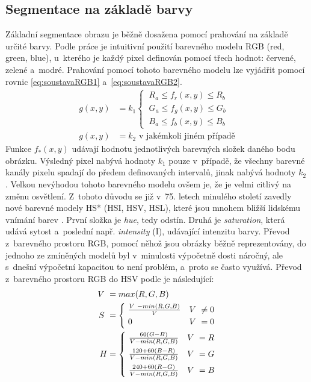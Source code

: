 \subsection*{Segmentace na základě barvy}
\label{zpusobyDetekceSegmentace}
Základní segmentace obrazu je běžně dosažena pomocí prahování na základě určité barvy. Podle práce \cite{tsDetect} je intuitivní použití barevného modelu RGB (red, green, blue), u~kterého je každý pixel definován pomocí třech hodnot: červené, zelené a~modré. Prahování pomocí tohoto barevného modelu lze vyjádřit pomocí rovnic \eqref{eq:soustavaRGB1} a~\eqref{eq:soustavaRGB2}.
\begin{align}
    \label{eq:soustavaRGB1}
    g(x,y) &= k_1\begin{cases}
    \ R_a \leq f_r(x,y) \leq R_b\\
    \ G_a \leq f_g(x,y) \leq G_b\\
    \ B_a \leq f_b(x,y) \leq B_b\end{cases}\\
    \label{eq:soustavaRGB2}
    g(x,y) &= k_2 \text{ v~jakémkoli jiném případě}
\end{align}
Funkce $f_*(x,y)$ udávají hodnotu jednotlivých barevných složek daného bodu obrázku. Výsledný pixel nabývá hodnoty $k_1$ pouze v~případě, že všechny barevné kanály pixelu spadají do předem definovaných intervalů, jinak nabývá hodnoty $k_2$. Velkou nevýhodou tohoto barevného modelu ovšem je, že je velmi citlivý na změnu osvětlení. Z~tohoto důvodu se již v~75. letech minulého století zavedly nové barevné modely HS* (HSI, HSV, HSL), které jsou mnohem bližší lidskému vnímání barev \cite{tsDetectOverview}. První složka je \emph{hue}, tedy odstín. Druhá je \emph{saturation}, která udává sytost a~poslední např. \emph{intensity} (I), udávající intenzitu barvy. Převod z~barevného prostoru RGB, pomocí něhož jsou obrázky běžně reprezentovány, do jednoho ze zmíněných modelů byl v~minulosti výpočetně dosti náročný, ale s~dnešní výpočetní kapacitou to není problém, a~proto se často využívá. Převod z~barevného prostoru RGB do HSV podle \cite{tsRychlaDetekce} je následující:
\begin{align}
    \label{eq:soustavaHSV}
    V~&= max(R,G,B)\\
    S~&= \begin{cases}
    \ \frac{V~- min(R,G,B)}{V}  & V~\neq 0\\
    \ 0 & V~= 0\end{cases}\\
    H &= \begin{cases}
    \ \frac{60(G-B)}{V - min(R,G,B)} & V~= R \vspace{4px}\\
    \ \frac{120+60(B-R)}{V - min(R,G,B)} & V~= G\vspace{4px}\\
    \ \frac{240+60(R-G)}{V - min(R,G,B)} & V~= B\end{cases}
\end{align}
